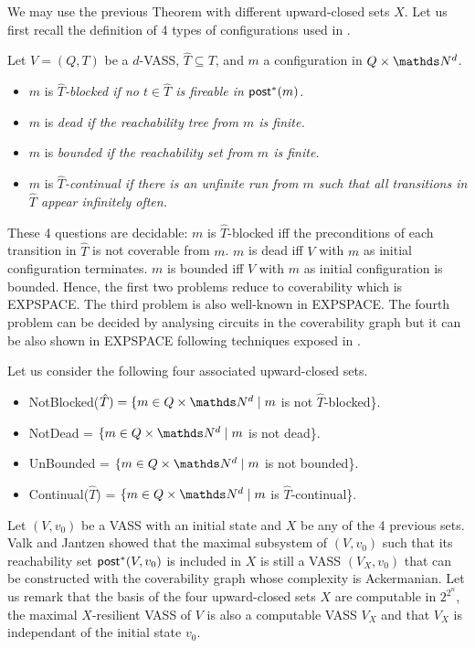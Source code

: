 We may use the previous Theorem with different upward-closed sets $X$. Let us first recall the definition of 4 types of configurations used in \cite{DBLP:journals/acta/ValkJ85}.

\begin{definition}
Let $V = (Q,T)$ be a $d$-VASS, $\hat{T} \subseteq T$, and $m$ a configuration in $Q \times \N^d$.
\begin{itemize}
\item  $m$ is \em{$\hat{T}$-blocked} if no $t \in \hat{T}$ is fireable in $\textsf{post}^*(m)$.
\item $m$ is \em{dead} if the reachability tree from $m$ is finite.
\item $m$ is \em{bounded} if the reachability set from $m$ is finite.
\item $m$ is \em{$\hat{T}$-continual} if there is an unfinite run from $m$ such that all transitions in $\hat{T}$ appear infinitely often.
\end{itemize}
\end{definition}

These 4 questions are decidable: $m$ is $\hat{T}$-blocked iff the preconditions of each transition in $\hat{T}$ is not coverable from $m$.
$m$ is dead iff $V$ with $m$ as initial configuration terminates. $m$ is bounded iff $V$ with $m$ as initial configuration is bounded.
Hence, the first two problems reduce to coverability which is EXPSPACE. The third problem is also well-known in EXPSPACE. The fourth problem can be decided by analysing circuits in the coverability graph \cite{DBLP:journals/acta/ValkJ85} but it can be also shown in EXPSPACE following techniques exposed in \cite{DBLP:journals/jcss/Demri13}.

Let us consider the following four associated upward-closed sets.

\begin{itemize}
\item  NotBlocked($\hat{T})= \{ m \in Q \times \N^d \mid m$ is not $\hat{T}$-blocked\}.
\item NotDead = $\{ m \in Q \times \N^d \mid m$ is not dead\}.
\item UnBounded = $\{ m \in Q \times \N^d \mid m$ is not bounded\}.
\item Continual($\hat{T}$) = $\{ m \in Q \times \N^d \mid m$ is $\hat{T}$-continual\}.
\end{itemize}

Let $(V,v_0)$ be a VASS with an initial state and $X$ be any of the 4 previous sets. Valk and Jantzen showed that the maximal subsystem of $(V,v_0)$ such that its reachability set $\textsf{post}^*(V,v_0)$ is included in $X$ is still a VASS $(V_X,v_0)$ that can be constructed with the coverability graph \cite{DBLP:journals/acta/ValkJ85} whose complexity is Ackermanian. Let us remark that the basis of the four upward-closed sets $X$ are computable in $2^{2^n}$, the maximal $X$-resilient VASS of $V$ is also a computable VASS $V_X$ and that $V_X$ is independant of the initial state $v_0$.




